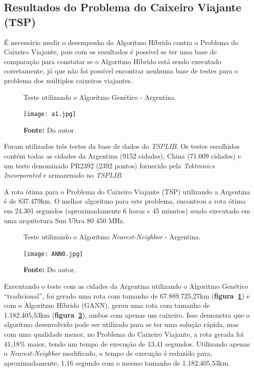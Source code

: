 \documentclass[12pt,openright,a4paper,oneside]{tcc}
\begin{document}
		\subsection{Resultados do Problema do Caixeiro Viajante (TSP)}

		É necessário medir o desempenho do Algoritmo Híbrido contra o Problema do Caixeiro Viajante, pois com os resultados é possível se ter uma base de comparação para constatar se o Algoritmo Híbrido está sendo executado corretamente, já que não foi possível encontrar nenhuma base de testes para o problema dos múltiplos caixeiros viajantes.

        \begin{figure}[h]
            \centering
            \caption{Teste utilizando o Algoritmo Genético - Argentina.}
            \texttt{[image: a1.jpg]}
            \caption*{\textbf{Fonte:} Do autor.}
            \label{figa1}
        \end{figure}

		Foram utilizados três testes da base de dados do \textit{TSPLIB}. Os testes escolhidos contém todas as cidades da Argentina (9152 cidades), China (71.009 cidades) e um teste denominado PR2392 (2392 pontos) fornecido pela \textit{Tektronics Incorporated} e armazenado no \textit{TSPLIB}. 

        A rota ótima para o Problema do Caixeiro Viajante (TSP) utilizando a Argentina é de 837.479km. O melhor algoritmo para este problema, encontrou a rota ótima em 24.301 segundos (aproximadamente 6 horas e 45 minutos) sendo executado em uma arquitetura Sun Ultra 80 450 MHz.

        \begin{figure}[h]
            \centering
            \caption{Teste utilizando o Algoritmo \textit{Nearest-Neighbor} - Argentina.}
            \texttt{[image: ANN0.jpg]}
            \caption*{\textbf{Fonte:} Do autor.}
            \label{figANN0}
        \end{figure}		

		Executando o teste com as cidades da Argentina utilizando o Algoritmo Genético ``tradicional'', foi gerado uma rota com tamanho de 67.889.725,27km (\textbf{figura~\ref{figa1}}) e com o Algoritmo Híbrido (GANN), gerou uma rota com tamanho de 1.182.405,53km (\textbf{figura~\ref{figANN0}}), ambos com apenas um caixeiro. Isso demonstra que o algoritmo desenvolvido pode ser utilizado para se ter uma solução rápida, mas com uma qualidade menor, no Problema do Caixeiro Viajante, a rota gerada foi 41,18\% maior, tendo um tempo de execução de 13,41 segundos. Utilizando apenas o \textit{Nearest-Neighbor} modificado, o tempo de execução é reduzido para, aproximadamente, 1,16 segundo com o mesmo tamanho de 1.182.405,53km.
\end{document}
